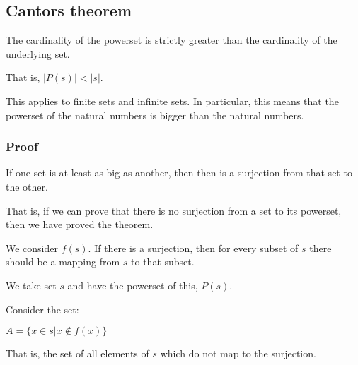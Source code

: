 
\subsection{Cantors theorem}

The cardinality of the powerset is strictly greater than the cardinality of the underlying set.

That is, \(|P(s)|<|s|\).

This applies to finite sets and infinite sets. In particular, this means that the powerset of the natural numbers is bigger than the natural numbers.

\subsubsection{Proof}

If one set is at least as big as another, then then is a surjection from that set to the other.

That is, if we can prove that there is no surjection from a set to its powerset, then we have proved the theorem.

We consider \(f(s)\). If there is a surjection, then for every subset of \(s\) there should be a mapping from \(s\) to that subset.

We take set \(s\) and have the powerset of this, \(P(s)\).

Consider the set:

\(A=\{x\in s|x\not\in f(x)\}\)

That is, the set of all elements of \(s\) which do not map to the surjection.


